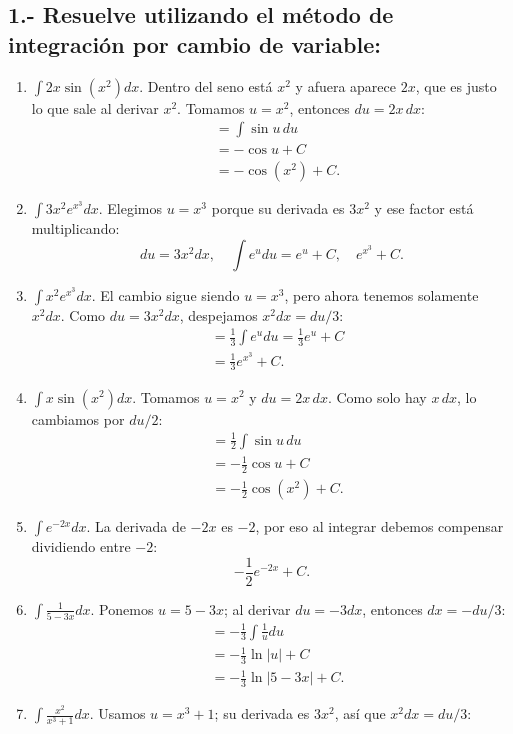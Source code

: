\documentclass[12pt, letterpaper]{article}
\makeatletter
\renewcommand{\alph}[1]{\expandafter\@alphlatin\csname c@#1\endcsname}
\newcommand{\@alphlatin}[1]{\ifcase#1\or a\or b\or c\or d\or e\or f\or g\or h\or i\or j\or k\or l\or m\or n\or o\or p\or q\or r\or s\or t\or u\or v\or w\or x\or y\or z\else\@ctrerr\fi}
\makeatother
\begin{document}
\subsection{1.- Resuelve utilizando el método de integración por cambio de variable:}
\begin{enumerate}[label=\alph*)]
  \item $\displaystyle\int2x\sin(x^2)dx$. Dentro del seno está $x^2$ y afuera aparece $2x$, que es justo lo que sale al derivar $x^2$. Tomamos $u=x^2$, entonces $du=2x\,dx$:
  \[
  \begin{aligned}
  &=\int\sin u\,du\\
  &=-\cos u+C\\
  &=\boxed{-\cos(x^2)+C}.
  \end{aligned}
  \]
  \item $\displaystyle\int3x^2e^{x^3}dx$. Elegimos $u=x^3$ porque su derivada es $3x^2$ y ese factor está multiplicando:
  \[
  du=3x^2dx,\quad \int e^u du=e^u+C,\quad \boxed{e^{x^3}+C}.
  \]
  \item $\displaystyle\int x^2e^{x^3}dx$. El cambio sigue siendo $u=x^3$, pero ahora tenemos solamente $x^2dx$. Como $du=3x^2dx$, despejamos $x^2dx=du/3$:
  \[
  \begin{aligned}
  &=\frac13\int e^u du=\frac13e^u+C\\
  &=\boxed{\frac13e^{x^3}+C}.
  \end{aligned}
  \]
  \item $\displaystyle\int x\sin(x^2)dx$. Tomamos $u=x^2$ y $du=2x\,dx$. Como solo hay $x\,dx$, lo cambiamos por $du/2$:
  \[
  \begin{aligned}
  &=\frac12\int\sin u\,du\\
  &=-\frac12\cos u+C\\
  &=\boxed{-\frac12\cos(x^2)+C}.
  \end{aligned}
  \]
  \item $\displaystyle\int e^{-2x}dx$. La derivada de $-2x$ es $-2$, por eso al integrar debemos compensar dividiendo entre $-2$:
  \[
  \boxed{-\frac12e^{-2x}+C}.
  \]
  \item $\displaystyle\int\frac1{5-3x}dx$. Ponemos $u=5-3x$; al derivar $du=-3dx$, entonces $dx=-du/3$:
  \[
  \begin{aligned}
  &= -\frac13\int\frac1u du\\
  &=-\frac13\ln|u|+C\\
  &=\boxed{-\frac13\ln|5-3x|+C}.
  \end{aligned}
  \]
  \item $\displaystyle\int\frac{x^2}{x^3+1}dx$. Usamos $u=x^3+1$; su derivada es $3x^2$, así que $x^2dx=du/3$:

\end{enumerate}
\end{document}
